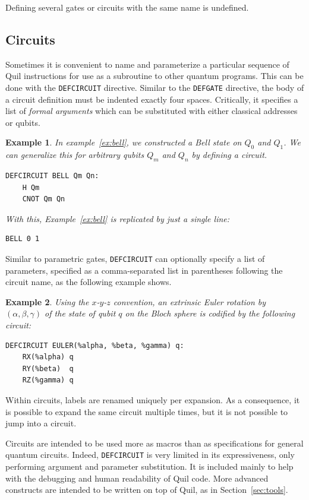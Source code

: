 \documentclass[conference]{IEEEtran}
\newtheorem{example}{Example}
\begin{document}
Defining several gates or circuits with the same name is undefined.

\subsection{Circuits}
Sometimes it is convenient to name and parameterize a particular sequence of Quil instructions for use as a subroutine to other quantum programs. This can be done with the \verb|DEFCIRCUIT| directive. Similar to the \verb|DEFGATE| directive, the body of a circuit definition must be indented exactly four spaces. Critically, it specifies a list of \emph{formal arguments} which can be substituted with either classical addresses or qubits.

\begin{example}
In example~\ref{ex:bell}, we constructed a Bell state on $Q_0$ and $Q_1$. We can generalize this for arbitrary qubits $Q_m$ and $Q_n$ by defining a circuit.
\begin{verbatim}
DEFCIRCUIT BELL Qm Qn:
    H Qm
    CNOT Qm Qn
\end{verbatim}
With this, Example~\ref{ex:bell} is replicated by just a single line:
\begin{verbatim}
BELL 0 1
\end{verbatim}
\end{example}

Similar to parametric gates, \verb|DEFCIRCUIT| can optionally specify a list of parameters, specified as a comma-separated list in parentheses following the circuit name, as the following example shows.

\begin{example}
Using the $x$-$y$-$z$ convention, an extrinsic Euler rotation by $(\alpha, \beta, \gamma)$ of the state of qubit $q$ on the Bloch sphere is codified by the following circuit:
\begin{verbatim}
DEFCIRCUIT EULER(%alpha, %beta, %gamma) q:
    RX(%alpha) q
    RY(%beta)  q
    RZ(%gamma) q
\end{verbatim}
\end{example}

Within circuits, labels are renamed uniquely per expansion. As a consequence, it is possible to expand the same circuit multiple times, but it is not possible to jump into a circuit.

Circuits are intended to be used more as macros than as specifications for general quantum circuits. Indeed, \verb|DEFCIRCUIT| is very limited in its expressiveness, only performing argument and parameter substitution. It is included mainly to help with the debugging and human readability of Quil code.  More advanced constructs are intended to be written on top of Quil, as in Section~\ref{sec:tools}.
\end{document}
